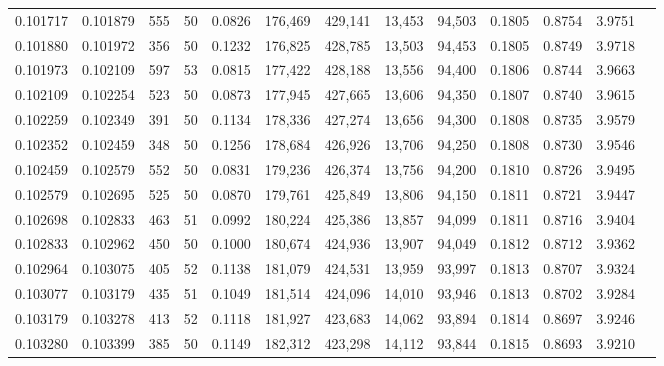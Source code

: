 \begin{tabular}{rrrrrrrrrrrrr}
0.101717 & 0.101879 &   555 &  50 &                                     0.0826 & 176,469 & 429,141 &  13,453 &  94,503 & 0.1805 & 0.8754 & 3.9751 \\
0.101880 & 0.101972 &   356 &  50 &                                     0.1232 & 176,825 & 428,785 &  13,503 &  94,453 & 0.1805 & 0.8749 & 3.9718 \\
0.101973 & 0.102109 &   597 &  53 &                                     0.0815 & 177,422 & 428,188 &  13,556 &  94,400 & 0.1806 & 0.8744 & 3.9663 \\
0.102109 & 0.102254 &   523 &  50 &                                     0.0873 & 177,945 & 427,665 &  13,606 &  94,350 & 0.1807 & 0.8740 & 3.9615 \\
0.102259 & 0.102349 &   391 &  50 &                                     0.1134 & 178,336 & 427,274 &  13,656 &  94,300 & 0.1808 & 0.8735 & 3.9579 \\
0.102352 & 0.102459 &   348 &  50 &                                     0.1256 & 178,684 & 426,926 &  13,706 &  94,250 & 0.1808 & 0.8730 & 3.9546 \\
0.102459 & 0.102579 &   552 &  50 &                                     0.0831 & 179,236 & 426,374 &  13,756 &  94,200 & 0.1810 & 0.8726 & 3.9495 \\
0.102579 & 0.102695 &   525 &  50 &                                     0.0870 & 179,761 & 425,849 &  13,806 &  94,150 & 0.1811 & 0.8721 & 3.9447 \\
0.102698 & 0.102833 &   463 &  51 &                                     0.0992 & 180,224 & 425,386 &  13,857 &  94,099 & 0.1811 & 0.8716 & 3.9404 \\
0.102833 & 0.102962 &   450 &  50 &                                     0.1000 & 180,674 & 424,936 &  13,907 &  94,049 & 0.1812 & 0.8712 & 3.9362 \\
0.102964 & 0.103075 &   405 &  52 &                                     0.1138 & 181,079 & 424,531 &  13,959 &  93,997 & 0.1813 & 0.8707 & 3.9324 \\
0.103077 & 0.103179 &   435 &  51 &                                     0.1049 & 181,514 & 424,096 &  14,010 &  93,946 & 0.1813 & 0.8702 & 3.9284 \\
0.103179 & 0.103278 &   413 &  52 &                                     0.1118 & 181,927 & 423,683 &  14,062 &  93,894 & 0.1814 & 0.8697 & 3.9246 \\
0.103280 & 0.103399 &   385 &  50 &                                     0.1149 & 182,312 & 423,298 &  14,112 &  93,844 & 0.1815 & 0.8693 & 3.9210 \\

\end{tabular}
